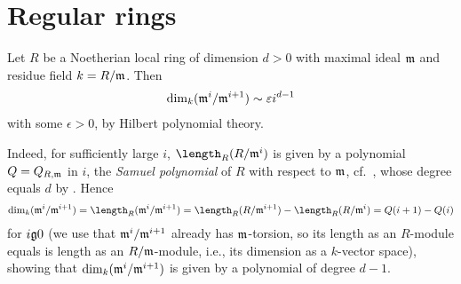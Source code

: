 \documentclass[a4paper,parskip=half,numbers=enddot, DIV=12]{scrreprt}
\begin{document}
\section{Regular rings}
Let $R$ be a Noetherian local ring of dimension $d>0$ with maximal ideal $\mathfrak{m}$ and residue field $k=R/\mathfrak{m}$. Then
\begin{align*}
	\dim_k(\mathfrak{m}^i/\mathfrak{m}^{i+1})\sim \varepsilon i^{d-1}
\end{align*}
with some $\epsilon>0$, by Hilbert polynomial theory.

Indeed, for sufficiently large $i$, $\length_R(R/\mm^i)$ is given by a polynomial $Q=Q_{R,\mathfrak{m}}$ in $i$, the \emph{Samuel polynomial} of $R$ with respect to $\mathfrak{m}$, cf.\ \cite[Definition~3.4.3]{alg2}, whose degree equals $d$ by \cite[Theorem~20]{alg2}. Hence
\begin{align*}
	\dim_k(\mm^i/\mm^{i+1})=\length_R(\mm^i/\mm^{i+1})=\length_R(R/\mm^{i+1})-\length_R(R/\mm^i)=Q(i+1)-Q(i)
\end{align*}
for $i\gge 0$ (we use that $\mathfrak{m}^i/\mathfrak{m}^{i+1}$ already has $\mathfrak{m}$-torsion, so its length as an $R$-module equals is length as an $R/\mathfrak{m}$-module, i.e., its dimension as a $k$-vector space), showing that $\dim_k(\mathfrak{m}^i/\mathfrak{m}^{i+1})$ is given by a polynomial of degree $d-1$.
\end{document}
